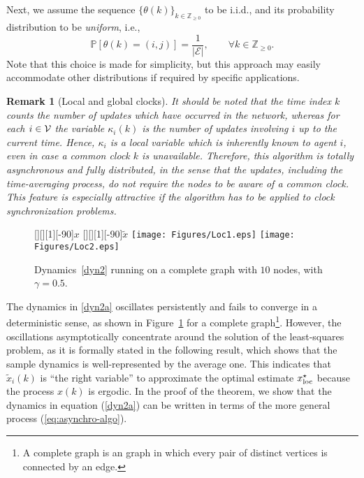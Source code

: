 \documentclass{IEEEtran}
\newtheorem{remark}{Remark}
\newcommand{\integernonnegative}{\mathbb{Z}_{\ge 0}}
\def\Prob{\mathbb{P}}
\newcommand{\1}{\mathbf{1}} \newcommand{\ind}{\mathds{1}}
\begin{document}
Next, we assume the sequence $\{\theta(k)\}_{k\in \integernonnegative}$ to be i.i.d., and its probability distribution to be {\it uniform}, i.e.,
\begin{equation}\label{eq:uniform}
\Prob[\theta(k)=(i,j)]=\frac{1}{|\mathcal{E}|}, \qquad\forall k\in\integernonnegative.
\end{equation}
Note that this choice is made for simplicity, but this approach may easily accommodate other distributions if required by specific applications.

\begin{remark}[Local and global clocks]
It should be noted that the time index $k$ counts the number of updates which have occurred in the network, whereas for each $i\in \mathcal{V}$ the variable $\kappa_i(k)$ is the number of updates involving $i$ up to the current time. Hence, $\kappa_i$ is a local variable which is inherently known to agent $i$, even in case a common clock $k$ is unavailable.
Therefore, this algorithm is {\it totally asynchronous} and {\it fully distributed}, in the sense that the updates, including the time-averaging process, do not require the nodes to be aware of a common clock. This feature is especially attractive if the algorithm has to be applied to clock synchronization problems.
\end{remark}

\begin{figure}[h]
\begin{center}
[][][1][-90]{$x$}
[][][1][-90]{$\widetilde x$}
\texttt{[image: Figures/Loc1.eps]}
\texttt{[image: Figures/Loc2.eps]}
\caption{Dynamics~\eqref{dyn2} running on a complete graph with $10$ nodes, with $\gamma=0.5$.}
\label{fig:simul-complete}
\end{center}
\end{figure}

The dynamics in \eqref{dyn2a} oscillates persistently and fails to converge in a deterministic sense, as shown in Figure~\ref{fig:simul-complete} for a complete graph\footnote{A 
complete graph is
an graph in which every pair of distinct vertices is connected by an edge.}.
However, the oscillations asymptotically concentrate around the solution of the least-squares problem, as it is formally stated in the following result, which shows that the sample dynamics is well-represented by the average one. This 
indicates that $\widetilde x_i(k)$ is ``the right variable'' to approximate the optimal estimate ${x_{\textup{loc}}^{\star}}$ because the process $x(k)$ is ergodic. In the proof of the theorem, we show that the dynamics in equation (\ref{dyn2a})
can be written in terms of the more general process (\ref{eq:asynchro-algo}). 
\end{document}
